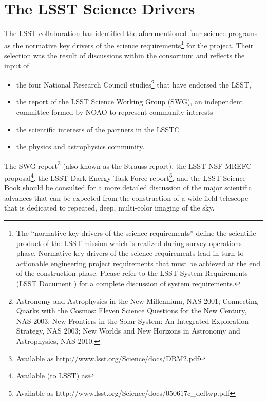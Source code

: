 \section{The LSST Science Drivers }
\label{scidriv}

The LSST collaboration has identified the aforementioned four science
programs as the normative key drivers of the science
requirements\footnote{The ``normative key drivers of the science requirements'' define
the scientific product of the LSST mission which is realized during survey operations phase.
Normative key drivers of the science requirements lead in turn to actionable engineering project
requirements that must be achieved at the end of the construction phase.  Please refer to the
LSST System Requirements (LSST Document ) for a complete discussion of system requirements.}
for the project. Their selection was the result of discussions within the
consortium and reflects the input of
\begin{itemize}
\item the four National Research Council studies\footnote{
  Astronomy and Astrophysics in the New Millennium, NAS 2001;
  Connecting Quarks with the Cosmos: Eleven Science Questions for the New Century, NAS 2003;
  New Frontiers in the Solar System: An Integrated Exploration Strategy, NAS 2003;
  New Worlds and New Horizons in Astronomy and Astrophysics, NAS 2010.
} that have endorsed the LSST,
\item the report of the LSST Science Working Group (SWG), an independent
      committee formed by NOAO to represent community interests
\item the scientific interests of the partners in the LSSTC
\item the physics and astrophysics community.
\end{itemize}

The SWG report\footnote{Available as
http://www.lsst.org/Science/docs/DRM2.pdf} (also known as the Strauss
report), the LSST NSF MREFC proposal\footnote{Available (to LSST) as
},
the LSST Dark Energy Task Force report\footnote{Available as
http://www.lsst.org/Science/docs/050617c\_deftwp.pdf}, and the LSST
Science Book should be
consulted for a more detailed discussion of the major scientific advances
that can be expected from the construction of a wide-field telescope that
is dedicated to repeated, deep, multi-color imaging of the sky.

